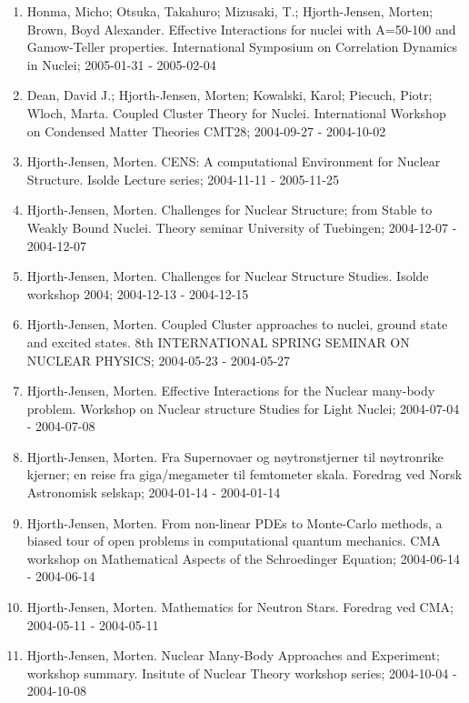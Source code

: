 \documentclass[%
oneside,                 %
final,                   %
10pt]{article}
\begin{document}
\begin{enumerate}
\item Honma, Micho; Otsuka, Takahuro; Mizusaki, T.; Hjorth-Jensen, Morten; Brown, Boyd Alexander. Effective Interactions for nuclei with A=50-100 and Gamow-Teller properties. International Symposium on Correlation Dynamics in Nuclei; 2005-01-31 - 2005-02-04

\item Dean, David J.; Hjorth-Jensen, Morten; Kowalski, Karol; Piecuch, Piotr; Wloch, Marta. Coupled Cluster Theory for Nuclei. International Workshop on Condensed Matter Theories CMT28; 2004-09-27 - 2004-10-02

\item Hjorth-Jensen, Morten. CENS: A computational Environment for Nuclear Structure. Isolde Lecture series; 2004-11-11 - 2005-11-25

\item Hjorth-Jensen, Morten.  Challenges for Nuclear Structure; from Stable to Weakly Bound Nuclei. Theory seminar University of Tuebingen; 2004-12-07 - 2004-12-07

\item Hjorth-Jensen, Morten.  Challenges for Nuclear Structure Studies. Isolde workshop 2004; 2004-12-13 - 2004-12-15

\item Hjorth-Jensen, Morten.  Coupled Cluster approaches to nuclei, ground state and excited states. 8th INTERNATIONAL SPRING SEMINAR ON NUCLEAR PHYSICS; 2004-05-23 - 2004-05-27

\item Hjorth-Jensen, Morten.  Effective Interactions for the Nuclear many-body problem. Workshop on Nuclear structure Studies for Light Nuclei; 2004-07-04 - 2004-07-08

\item Hjorth-Jensen, Morten. Fra Supernovaer og nøytronstjerner til nøytronrike kjerner; en reise fra giga/megameter til femtometer skala. Foredrag ved Norsk Astronomisk selskap; 2004-01-14 - 2004-01-14

\item Hjorth-Jensen, Morten. From non-linear PDEs to Monte-Carlo methods, a biased tour of open problems in computational quantum mechanics. CMA workshop on Mathematical Aspects of the Schroedinger Equation; 2004-06-14 - 2004-06-14

\item Hjorth-Jensen, Morten. Mathematics for Neutron Stars. Foredrag ved CMA; 2004-05-11 - 2004-05-11

\item Hjorth-Jensen, Morten. Nuclear Many-Body Approaches and Experiment; workshop summary. Insitute of Nuclear Theory workshop series; 2004-10-04 - 2004-10-08


\end{enumerate}
\end{document}
